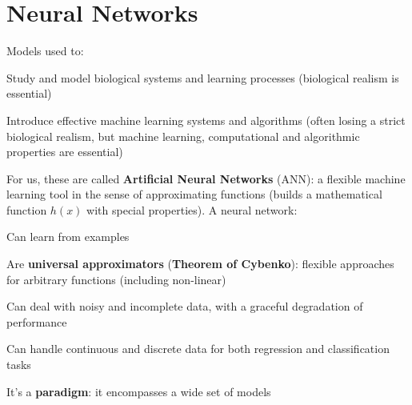 \documentclass[10pt]{report}
\begin{document}
\section{Neural Networks} Models used to:
\begin{list}{}{}
	\item Study and model biological systems and learning processes (biological realism is essential)
	\item Introduce effective machine learning systems and algorithms (often losing a strict biological realism, but machine learning, computational and algorithmic properties are essential)
\end{list}
For us, these are called \textbf{Artificial Neural Networks} (ANN): a flexible machine learning tool in the sense of approximating functions (builds a mathematical function $h(x)$ with special properties). A neural network:
\begin{list}{}{}
	\item Can learn from examples
	\item Are \textbf{universal approximators} (\textbf{Theorem of Cybenko}): flexible approaches for arbitrary functions (including non-linear)
	\item Can deal with noisy and incomplete data, with a graceful degradation of performance
	\item Can handle continuous and discrete data for both regression and classification tasks
	\item It's a \textbf{paradigm}: it encompasses a wide set of models
\end{list}
\end{document}
